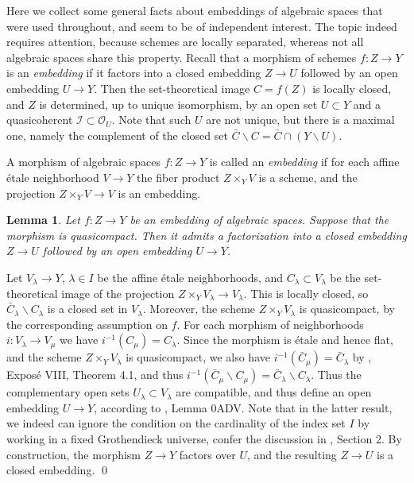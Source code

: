 \documentclass[oneside, 12pt]{amsart}
\newcommand\mylabel[1]{\label{#1}\marginpar{\raggedright\vspace{-1ex}\medskip\medskip\footnotesize \tt #1}}
\renewcommand\mylabel[1]{\label{#1}}
\newtheorem{lemma}[theorem]{Lemma}
\theoremstyle{definition}
\theoremstyle{remark}
\newcommand{\shI}{\mathscr{I}}
\renewcommand{\O}{\mathscr{O}}
\newcommand{\ra}{\rightarrow}
\begin{document}
Here we collect some general facts about embeddings of algebraic spaces that were used throughout, and seem to be of independent
interest. The topic indeed requires   attention,
because   schemes are locally separated, whereas not all algebraic spaces share this property.
Recall that a morphism of schemes $f:Z\ra Y$ is   an \emph{embedding} 
if it factors into a closed embedding $Z\ra U$ followed by an open embedding $U\ra Y$.
Then the set-theoretical image $C=f(Z)$ is locally closed, and $Z$ is determined, up 
to unique isomorphism,   by  an open set $U\subset Y$ and a quasicoherent     $\shI\subset \O_U$.
Note that such   $U$ are not unique, but there is a maximal one, namely
the complement of  the closed set $\bar{C}\smallsetminus C=\bar{C}\cap (Y\smallsetminus U)$.

A morphism of algebraic spaces $f:Z\ra Y$ is called an \emph{embedding} if for
each affine \'etale neighborhood $V\ra Y$ the fiber product $Z\times_YV$ is a scheme,
and the projection $Z\times_YV\ra V$ is an embedding.  

\begin{lemma}
\mylabel{embedding spaces}
Let  $f:Z\ra Y$ be an embedding of algebraic spaces. Suppose that the morphism is quasicompact.
Then it admits  a factorization into a closed embedding $Z\ra U$ followed
by an open embedding $U\ra Y$.
\end{lemma}

\proof
Let $V_\lambda \ra Y$, $\lambda\in I$ be the affine \'etale neighborhoods, and $C_\lambda \subset V_\lambda $ 
be the set-theoretical image  of the projection $Z\times_YV_\lambda\ra V_\lambda$. This is locally closed, 
so  $\bar{C}_\lambda\smallsetminus C_\lambda$ is a closed set in $V_\lambda$. Moreover,  the scheme $Z\times_YV_\lambda$
is quasicompact, by the corresponding assumption on $f$.
For each  morphism of neighborhoods $i:V_\lambda\ra V_\mu$    we have $i^{-1}(C_\mu)=C_\lambda$.
Since the morphism  is \'etale and hence flat, and the scheme $Z\times_YV_\lambda$ is quasicompact,
we also have $i^{-1}(\bar{C}_\mu) = \bar{C}_\lambda$ by \cite{SGA 1}, Expos\'e VIII, Theorem 4.1, and thus
$i^{-1}(\bar{C}_\mu\smallsetminus C_\mu)=\bar{C}_\lambda\smallsetminus C_\lambda$.
Thus the complementary  open sets $U_\lambda\subset V_\lambda$ are compatible, and thus define an open embedding $U\ra Y$,
according to \cite{SP}, Lemma 0ADV. Note that in the latter result, we indeed can ignore the condition on the cardinality of the index set $I$   by working 
in a fixed Grothendieck universe, confer the discussion in \cite{Schroeer 2017}, Section 2.
By construction, the morphism $Z\ra Y$ factors over $U$, and the resulting $Z\ra U$ is a closed embedding.
\qed
\end{document}
